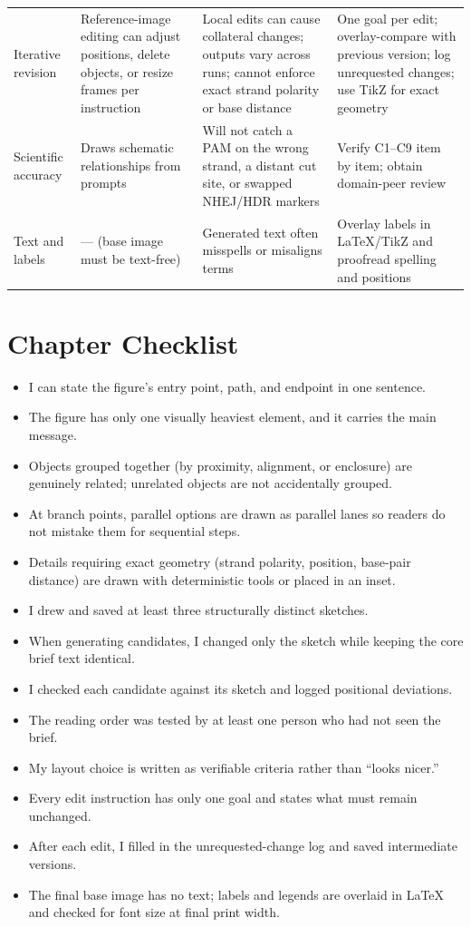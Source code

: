 \begin{table}[htbp]
\begin{tabularx}{\linewidth}{@{}>{\raggedright\arraybackslash}p{22mm}YYY@{}}
Iterative revision & Reference-image editing can adjust positions, delete objects, or resize frames per instruction & Local edits can cause collateral changes; outputs vary across runs; cannot enforce exact strand polarity or base distance & One goal per edit; overlay-compare with previous version; log unrequested changes; use TikZ for exact geometry \\
Scientific accuracy & Draws schematic relationships from prompts & Will not catch a PAM on the wrong strand, a distant cut site, or swapped NHEJ/HDR markers & Verify C1--C9 item by item; obtain domain-peer review \\
Text and labels & --- (base image must be text-free) & Generated text often misspells or misaligns terms & Overlay labels in LaTeX/TikZ and proofread spelling and positions \\
\bottomrule
\end{tabularx}
\end{table}

\section{Chapter Checklist}

\begin{itemize}
\item I can state the figure's entry point, path, and endpoint in one sentence.
\item The figure has only one visually heaviest element, and it carries the main message.
\item Objects grouped together (by proximity, alignment, or enclosure) are genuinely related; unrelated objects are not accidentally grouped.
\item At branch points, parallel options are drawn as parallel lanes so readers do not mistake them for sequential steps.
\item Details requiring exact geometry (strand polarity, position, base-pair distance) are drawn with deterministic tools or placed in an inset.
\item I drew and saved at least three structurally distinct sketches.
\item When generating candidates, I changed only the sketch while keeping the core brief text identical.
\item I checked each candidate against its sketch and logged positional deviations.
\item The reading order was tested by at least one person who had not seen the brief.
\item My layout choice is written as verifiable criteria rather than ``looks nicer.''
\item Every edit instruction has only one goal and states what must remain unchanged.
\item After each edit, I filled in the unrequested-change log and saved intermediate versions.
\item The final base image has no text; labels and legends are overlaid in LaTeX and checked for font size at final print width.
\end{itemize}

